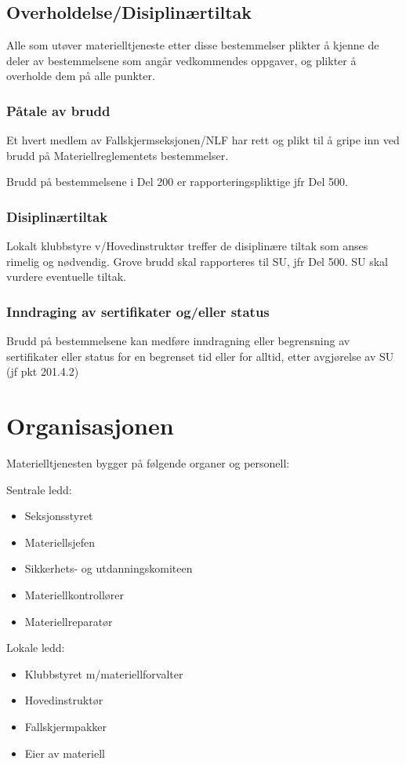 \subsection{Overholdelse/Disiplinærtiltak}
Alle som utøver materielltjeneste etter disse bestemmelser plikter å kjenne de deler av bestemmelsene som angår vedkommendes oppgaver, og plikter å overholde dem på alle punkter.

\subsubsection{Påtale av brudd}
Et hvert medlem av Fallskjermseksjonen/NLF har rett og plikt til å gripe inn ved brudd på Materiellreglementets bestemmelser.

Brudd på bestemmelsene i Del 200 er rapporteringspliktige jfr Del 500.

\subsubsection{Disiplinærtiltak}
Lokalt klubbstyre v/Hovedinstruktør treffer de disiplinære tiltak som anses rimelig og nødvendig. Grove brudd skal rapporteres til SU, jfr Del 500. SU skal vurdere eventuelle tiltak.

\subsubsection{Inndraging av sertifikater og/eller status}
Brudd på bestemmelsene kan medføre inndragning eller begrensning av sertifikater eller status for en begrenset tid eller for alltid, etter avgjørelse av SU (jf pkt 201.4.2)

\section{Organisasjonen}
Materielltjenesten bygger på følgende organer og personell:

Sentrale ledd:
\begin{itemize}
	\item Seksjonsstyret
	\item Materiellsjefen
	\item Sikkerhets- og utdanningskomiteen
	\item Materiellkontrollører
	\item Materiellreparatør
\end{itemize}

Lokale ledd:
\begin{itemize}
	\item Klubbstyret m/materiellforvalter
	\item Hovedinstruktør
	\item Fallskjermpakker
	\item Eier av materiell
\end{itemize}

